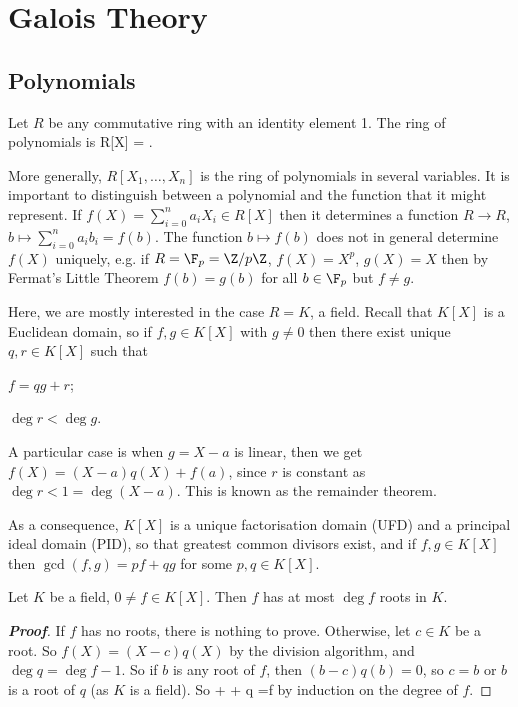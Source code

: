 

\chapter{Galois Theory}


\section{Polynomials}

Let $R$ be any commutative ring with an identity element 1. The ring of polynomials is
\be
R[X] = .
\ee

More generally, $R[X_1, \dots ,X_n]$ is the ring of polynomials in several variables. It is important to distinguish between a polynomial and the function that it might represent. If $f(X) = \sum^n_{i=0} a_iX_i \in R[X]$ then it determines a function $R \to R$, $b \mapsto \sum^n_{i=0} a_ib_i = f(b)$. The function $b \mapsto f(b)$ does not in general determine $f(X)$ uniquely, e.g. if $R = \F_p = \Z/p\Z$, $f(X) = X^p$, $g(X) = X$ then by Fermat's Little Theorem $f(b) = g(b)$ for all $b \in \F_p$ but $f \neq g$.

Here, we are mostly interested in the case $R = K$, a field. Recall that $K[X]$ is a Euclidean domain, so if $f, g \in K[X]$ with $g \neq  0$ then there exist unique $q, r \in K[X]$ such that 
\ben
\item [(i)] $f = qg + r$;
\item [(ii)] $\deg r < \deg g$.
\een

A particular case is when $g = X - a$ is linear, then we get $f(X) = (X - a)q(X) + f(a)$, since $r$ is constant as $\deg r < 1 = \deg(X -a)$. This is known as the remainder theorem.

As a consequence, $K[X]$ is a unique factorisation domain (UFD) and a principal ideal domain (PID), so that greatest common divisors exist, and if $f, g \in K[X]$ then $\gcd(f, g) = pf + qg$ for some $p, q \in K[X]$.

\begin{proposition}
Let $K$ be a field, $0 \neq  f \in K[X]$. Then $f$ has at most $\deg f$ roots in $K$.
\end{proposition}

\begin{proof}[\bf Proof]
If $f$ has no roots, there is nothing to prove. Otherwise, let $c \in K$ be a root. So $f(X) = (X - c)q(X)$ by the division algorithm, and $\deg q = \deg f - 1$. So if $b$ is any root of $f$, then $(b - c)q(b) = 0$, so $c = b$ or $b$ is a root of $q$ (as $K$ is a field). So
\be
{}  +   + \deg q =\deg f
\ee
by induction on the degree of $f$. 
\end{proof}


